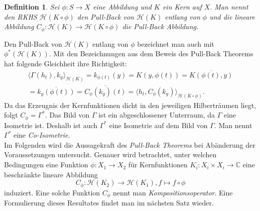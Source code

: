 \documentclass[12pt,titlepage,twoside,cleardoublepage]{article}
\theoremstyle{nummermitklammern}
\newtheorem{definition}[temp]{Definition}
\newtheorem{definition}[zahl]{Definition}
\numberwithin{equation}{section}
\begin{document}
\begin{definition}
Sei $\phi:S\to X$ eine Abbildung und $K$ ein Kern auf $X.$ Man nennt den RKHS $\mathcal{H}(K\circ \phi)$ den \emph{Pull-Back} von $\mathcal{H}(K)$ entlang von $\phi$ und die lineare Abbildung $C_{\phi}:\mathcal{H}(K)\to \mathcal{H}(K\circ \phi)$ die \emph{Pull-Back Abbildung}.   
\end{definition}
Den Pull-Back von $\mathcal{H}(K)$ entlang von $\phi$ bezeichnet man auch mit $\phi^*(\mathcal{H}(K)).$
Mit den Bezeichnungen aus dem Beweis des Pull-Back Theorems hat folgende Gleichheit ihre Richtigkeit:
\begin{align*}
\langle \Gamma(h_t),k_y\rangle_{\mathcal{H}(K)}=k_{\phi(t)}(y)=K(y,\phi(t))=\overline{K(\phi(t),y)}\\
=\overline{k_y(\phi(t))}=\overline{C_{\phi}(k_y)(t)}=\langle h_t,C_{\phi}(k_y)\rangle_{\mathcal{H}(K\circ \phi)}.
\end{align*}
Da das Erzeugnis der Kernfunktionen dicht in den jeweiligen Hilberträumen liegt, folgt $C_{\phi}=\Gamma^*.$ Das Bild von $\Gamma$ ist ein abgeschlossener Unterraum, da $\Gamma$ eine Isometrie ist. Deshalb ist auch $\Gamma^*$ eine Isometrie auf dem Bild von $\Gamma.$ Man nennt $\Gamma^*$ eine \emph{Co-Isometrie}.\\
Im Folgenden wird die Aussagekraft des \emph{Pull-Back Theorems} bei Abänderung der Voraussetzungen untersucht. Genauer wird betrachtet, unter welchen Bedingungen eine Funktion $\phi:X_1\to X_2$ für Kernfunktionen $K_i:X_i\times X_i\to \mathbb{C}$ eine beschränkte lineare Abbildung 
\[
C_{\phi}:\mathcal{H}(K_2)\to \mathcal{H}(K_1),f\mapsto f\circ \phi
\] induziert. Eine solche Funktion $C_{\phi} $ nennt man \emph{Kompositionsoperator}. Eine Formulierung dieses Resultates findet man im nächsten Satz wieder.
\end{document}
